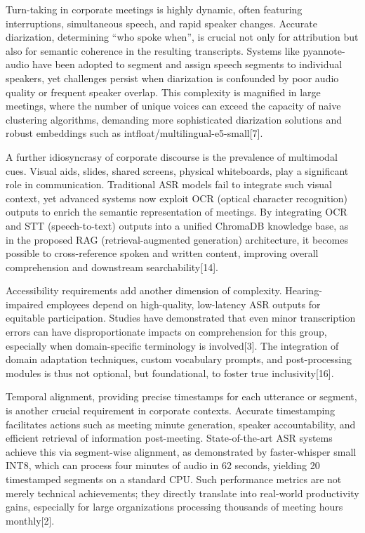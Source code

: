 \documentclass[12pt,a4paper]{article}
\begin{document}
Turn-taking in corporate meetings is highly dynamic, often featuring interruptions, simultaneous speech, and rapid speaker changes. Accurate diarization, determining “who spoke when”, is crucial not only for attribution but also for semantic coherence in the resulting transcripts. Systems like pyannote-audio have been adopted to segment and assign speech segments to individual speakers, yet challenges persist when diarization is confounded by poor audio quality or frequent speaker overlap. This complexity is magnified in large meetings, where the number of unique voices can exceed the capacity of naive clustering algorithms, demanding more sophisticated diarization solutions and robust embeddings such as intfloat/multilingual-e5-small[7].


A further idiosyncrasy of corporate discourse is the prevalence of multimodal cues. Visual aids, slides, shared screens, physical whiteboards, play a significant role in communication. Traditional ASR models fail to integrate such visual context, yet advanced systems now exploit OCR (optical character recognition) outputs to enrich the semantic representation of meetings. By integrating OCR and STT (speech-to-text) outputs into a unified ChromaDB knowledge base, as in the proposed RAG (retrieval-augmented generation) architecture, it becomes possible to cross-reference spoken and written content, improving overall comprehension and downstream searchability[14].


Accessibility requirements add another dimension of complexity. Hearing-impaired employees depend on high-quality, low-latency ASR outputs for equitable participation. Studies have demonstrated that even minor transcription errors can have disproportionate impacts on comprehension for this group, especially when domain-specific terminology is involved[3]. The integration of domain adaptation techniques, custom vocabulary prompts, and post-processing modules is thus not optional, but foundational, to foster true inclusivity[16].


Temporal alignment, providing precise timestamps for each utterance or segment, is another crucial requirement in corporate contexts. Accurate timestamping facilitates actions such as meeting minute generation, speaker accountability, and efficient retrieval of information post-meeting. State-of-the-art ASR systems achieve this via segment-wise alignment, as demonstrated by faster-whisper small INT8, which can process four minutes of audio in 62 seconds, yielding 20 timestamped segments on a standard CPU. Such performance metrics are not merely technical achievements; they directly translate into real-world productivity gains, especially for large organizations processing thousands of meeting hours monthly[2].
\end{document}
